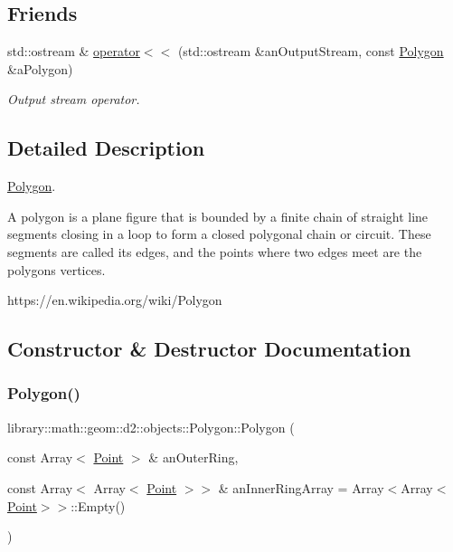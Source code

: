 \subsection*{Friends}
\begin{DoxyCompactItemize}
\item 
std\+::ostream \& \hyperlink{classlibrary_1_1math_1_1geom_1_1d2_1_1objects_1_1_polygon_ae57177a1fae265be31aca4cdcd6add82}{operator$<$$<$} (std\+::ostream \&an\+Output\+Stream, const \hyperlink{classlibrary_1_1math_1_1geom_1_1d2_1_1objects_1_1_polygon}{Polygon} \&a\+Polygon)
\begin{DoxyCompactList}\small\item\em Output stream operator. \end{DoxyCompactList}\end{DoxyCompactItemize}


\subsection{Detailed Description}
\hyperlink{classlibrary_1_1math_1_1geom_1_1d2_1_1objects_1_1_polygon}{Polygon}. 

A polygon is a plane figure that is bounded by a finite chain of straight line segments closing in a loop to form a closed polygonal chain or circuit. These segments are called its edges, and the points where two edges meet are the polygon\textquotesingle{}s vertices.

https\+://en.wikipedia.\+org/wiki/\+Polygon 

\subsection{Constructor \& Destructor Documentation}
\mbox{\label{classlibrary_1_1math_1_1geom_1_1d2_1_1objects_1_1_polygon_ad2a0b0bcd5301dbcd9e2fa101fbd220b}} 
\subsubsection{\texorpdfstring{Polygon()}{Polygon()}\hspace{0.1cm}{\footnotesize\ttfamily [1/2]}}
{\footnotesize\ttfamily library\+::math\+::geom\+::d2\+::objects\+::\+Polygon\+::\+Polygon (\begin{DoxyParamCaption}\item[{const Array$<$ \hyperlink{classlibrary_1_1math_1_1geom_1_1d2_1_1objects_1_1_point}{Point} $>$ \&}]{an\+Outer\+Ring,  }\item[{const Array$<$ Array$<$ \hyperlink{classlibrary_1_1math_1_1geom_1_1d2_1_1objects_1_1_point}{Point} $>$$>$ \&}]{an\+Inner\+Ring\+Array = {\ttfamily Array$<$Array$<$\hyperlink{classlibrary_1_1math_1_1geom_1_1d2_1_1objects_1_1_point}{Point}$>$$>$\+:\+:Empty()} }\end{DoxyParamCaption})}




